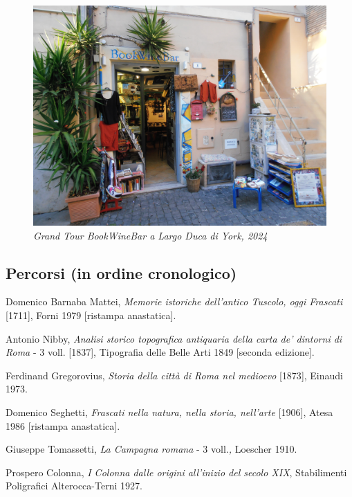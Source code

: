 \documentclass[
  letterpaper,
  DIV=11,
  numbers=noendperiod]{scrartcl}
\begin{document}
\begin{figure}

{\centering \includegraphics{../../images/immagini_bookwinebar/fuori1.JPG}

}

\caption{\emph{Grand Tour BookWineBar a Largo Duca di York, 2024}}

\end{figure}

\hypertarget{percorsi-in-ordine-cronologico}{%
\subsection{Percorsi (in ordine
cronologico)}\label{percorsi-in-ordine-cronologico}}

Domenico Barnaba Mattei, \emph{Memorie istoriche dell'antico Tuscolo,
oggi Frascati} {[}1711{]}, Forni 1979 {[}ristampa anastatica{]}.

Antonio Nibby, \emph{Analisi storico topografica antiquaria della carta
de' dintorni di Roma} - 3 voll. {[}1837{]}, Tipografia delle Belle Arti
1849 {[}seconda edizione{]}.

Ferdinand Gregorovius, \emph{Storia della città di Roma nel medioevo}
{[}1873{]}, Einaudi 1973.

Domenico Seghetti, \emph{Frascati nella natura, nella storia, nell'arte}
{[}1906{]}, Atesa 1986 {[}ristampa anastatica{]}.

Giuseppe Tomassetti, \emph{La Campagna romana} - 3 voll.\emph{,}
Loescher 1910.

Prospero Colonna, \emph{I Colonna dalle origini all'inizio del secolo
XIX}, Stabilimenti Poligrafici Alterocca-Terni 1927.
\end{document}
